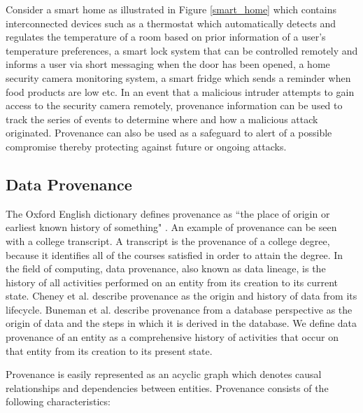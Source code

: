 \documentclass[conference]{IEEEtran}
\begin{document}
Consider a smart home as illustrated in Figure \ref{smart_home} which contains interconnected devices such as a thermostat which automatically detects and regulates the temperature of a room based on prior information of a user's temperature preferences, a smart lock system that can be controlled remotely and informs a user via short messaging when the door has been opened, a home security camera monitoring system, a smart fridge which sends a reminder when food products are low etc. In an event that a malicious intruder attempts  to gain access to the security camera remotely, provenance information can be used to track the series  of events to determine where and how a malicious attack originated. Provenance can also be used as a safeguard to alert of a possible  compromise thereby protecting against future or ongoing attacks. 



\subsection{Data Provenance}

The Oxford English dictionary defines provenance as ``the place of origin or earliest
known history of something" \cite{TCDP1999}. An example of provenance can be seen with a college transcript. A transcript is the provenance of a college degree, because it identifies all of the
courses satisfied in order to attain the degree. In the field of computing, data provenance, also known as data lineage, is the history of all activities performed on an entity from its creation to its current state.
Cheney et al. \cite{cheney_provenance_2009}  describe provenance as the origin and history of data from its lifecycle. Buneman et al. \cite{buneman_why_2001} describe provenance from a database perspective as the origin of data and the steps in which it is derived in the database. We define data provenance of an entity as a comprehensive history of activities that occur on that entity from its creation to its present state.


Provenance is easily represented as an acyclic graph which denotes causal relationships and dependencies between entities. Provenance consists of the following characteristics:
 
\end{document}
